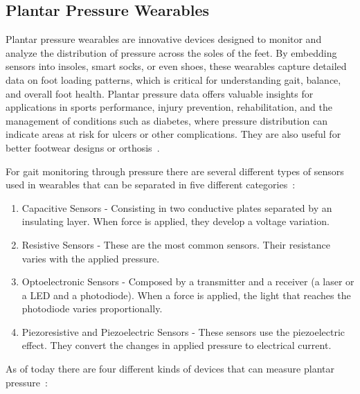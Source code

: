 \subsection{Plantar Pressure Wearables}
\label{ssec:plantar_pressure_wearables_STA}

Plantar pressure wearables are innovative devices designed to monitor and analyze the distribution of pressure across the soles of the feet. By embedding sensors into insoles, smart 
socks, or even shoes, these wearables capture detailed data on foot loading patterns, which is critical for understanding gait, balance, and overall foot health. Plantar pressure data 
offers valuable insights for applications in sports performance, injury prevention, rehabilitation, and the management of conditions such as diabetes, where pressure distribution can 
indicate areas at risk for ulcers or other complications. They are also useful for better footwear designs or orthosis~\cite{coimbra, embedding, devInsole, deepLearn}.

For gait monitoring through pressure there are several different types of sensors used in wearables that can be separated in five different categories~\cite{smartSocks}:

\begin{enumerate}
  \item Capacitive Sensors - Consisting in two conductive plates separated by an insulating layer. When force is applied, they develop a voltage variation.
  \item Resistive Sensors - These are the most common sensors. Their resistance varies with the applied pressure.
  \item Optoelectronic Sensors - Composed by a transmitter and a receiver (a laser or a LED and a photodiode). When a force is applied, the light that reaches the photodiode varies proportionally.
  \item Piezoresistive and Piezoelectric Sensors - These sensors use the  piezoelectric effect. They convert the changes in applied pressure to electrical current.
\end{enumerate}

As of today there are four different kinds of devices that can measure plantar pressure~\cite{smartSocks}:

